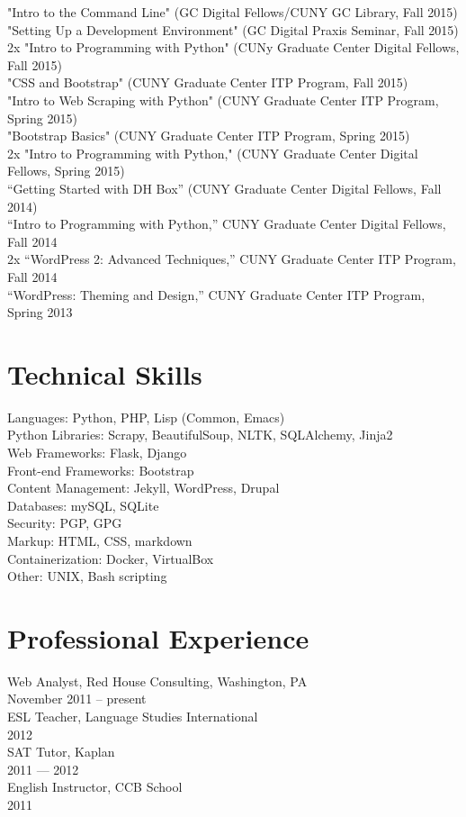 \documentclass[11pt]{article}
\begin{document}
"Intro to the Command Line" (GC Digital Fellows/CUNY GC Library, Fall 2015)\\
"Setting Up a Development Environment" (GC Digital Praxis Seminar, Fall 2015)\\
2x "Intro to Programming with Python" (CUNy Graduate Center Digital Fellows, Fall 2015)\\
"CSS and Bootstrap" (CUNY Graduate Center ITP Program, Fall 2015)\\
"Intro to Web Scraping with Python" (CUNY Graduate Center ITP Program, Spring 2015)\\
"Bootstrap Basics" (CUNY Graduate Center ITP Program, Spring 2015)\\
2x "Intro to Programming with Python," (CUNY Graduate Center Digital Fellows, Spring 2015)\\
“Getting Started with DH Box” (CUNY Graduate Center Digital Fellows, Fall 2014)\\
“Intro to Programming with Python,” CUNY Graduate Center Digital Fellows, Fall 2014\\
2x “WordPress 2: Advanced Techniques,” CUNY Graduate Center ITP Program, Fall 2014\\
“WordPress: Theming and Design,” CUNY Graduate Center ITP Program, Spring 2013\\

\section*{Technical Skills}
\label{sec:orgheadline11}

Languages: Python, PHP, Lisp (Common, Emacs)\\
Python Libraries: Scrapy, BeautifulSoup, NLTK, SQLAlchemy, Jinja2\\
Web Frameworks: Flask, Django\\
Front-end Frameworks: Bootstrap\\
Content Management: Jekyll, WordPress, Drupal\\
Databases: mySQL, SQLite\\
Security: PGP, GPG\\
Markup: HTML, CSS, markdown\\
Containerization: Docker, VirtualBox\\
Other: UNIX, Bash scripting\\
\section*{Professional Experience}
\label{sec:orgheadline12}

Web Analyst, Red House Consulting, Washington, PA\\
November 2011 – present\\

ESL Teacher, Language Studies International\\
2012\\

SAT Tutor, Kaplan\\
2011 — 2012\\

English Instructor, CCB School\\
2011\\
\end{document}
